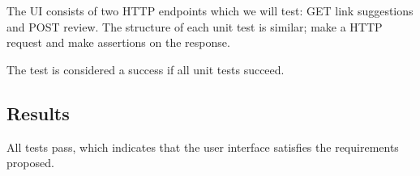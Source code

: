 The UI consists of two HTTP endpoints which we will test: GET link suggestions and POST review. The structure of each unit test is similar; make a HTTP request and make assertions on the response. 

The test is considered a success if all unit tests succeed.

\subsection{Results}
All tests pass, which indicates that the user interface satisfies the requirements proposed.  
